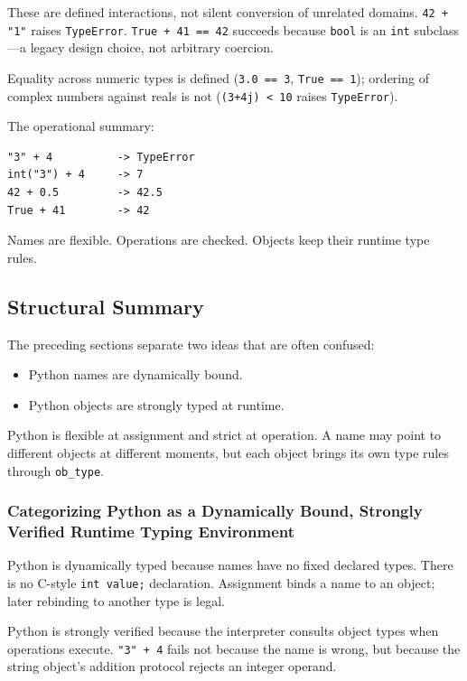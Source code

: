 \documentclass[a4paper,twoside]{report}
\begin{document}
These are defined interactions, not silent conversion of unrelated domains. \texttt{42 + "1"} raises \texttt{TypeError}. \texttt{True + 41 == 42} succeeds because \texttt{bool} is an \texttt{int} subclass---a legacy design choice, not arbitrary coercion.

Equality across numeric types is defined (\texttt{3.0 == 3}, \texttt{True == 1}); ordering of complex numbers against reals is not (\texttt{(3+4j) < 10} raises \texttt{TypeError}).

The operational summary:

\begin{verbatim}
"3" + 4          -> TypeError
int("3") + 4     -> 7
42 + 0.5         -> 42.5
True + 41        -> 42
\end{verbatim}

Names are flexible. Operations are checked. Objects keep their runtime type rules.


\subsection{Structural Summary}

The preceding sections separate two ideas that are often confused:

\begin{itemize}
    \item Python names are dynamically bound.
    \item Python objects are strongly typed at runtime.
\end{itemize}

Python is flexible at assignment and strict at operation. A name may point to different objects at different moments, but each object brings its own type rules through \texttt{ob\_type}.

\subsubsection{Categorizing Python as a Dynamically Bound, Strongly Verified Runtime Typing Environment}

Python is dynamically typed because names have no fixed declared types. There is no C-style \texttt{int value;} declaration. Assignment binds a name to an object; later rebinding to another type is legal.

Python is strongly verified because the interpreter consults object types when operations execute. \texttt{"3" + 4} fails not because the name is wrong, but because the string object's addition protocol rejects an integer operand.
\end{document}
